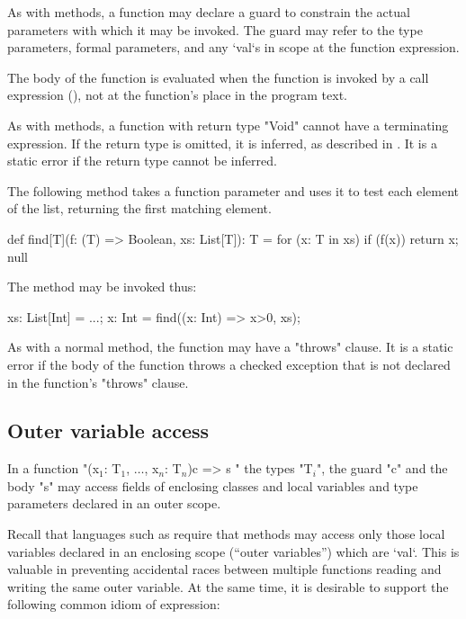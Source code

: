 As with methods, a function may declare a guard to
constrain the actual parameters with which it may be invoked.
The guard may refer to the type parameters, formal parameters,
and any \xcd`val`s in scope at the function expression.

The body of the function is evaluated when the function is
invoked by a call expression (), not at the function's
place in the program text.

As with methods, a function with return type \xcd"Void" cannot
have a terminating expression. 
If the return type is omitted, it is inferred, as described in
.
It is a static error if the return type cannot be inferred. 


\begin{example}
The following method takes a function parameter and uses it to
test each element of the list, returning the first matching
element.
\begin{xten}
def find[T](f: (T) => Boolean, xs: List[T]): T = {
  for (x: T in xs)
    if (f(x)) return x;
  null
}
\end{xten}

The method may be invoked thus:
\begin{xten}
xs: List[Int] = ...;
x: Int = find((x: Int) => x>0, xs);
\end{xten}
\end{example}

As with a normal method, the function may have a \xcd"throws"
clause. It is a static error if the body of the function throws a
checked exception that is not declared in the function's \xcd"throws"
clause.

\subsection{Outer variable access}

In a function
\xcdmath"(x$_1$: T$_1$, $\dots$, x$_n$: T$_n$){c} => { s }"
the types \xcdmath"T$_i$", the guard \xcd"c" and the body \xcd"s"
may access fields of enclosing classes and local variables and type
parameters declared in an outer scope.

Recall that languages such as \java{} require that methods may
access only those local variables declared in an enclosing scope
(``outer variables'') which are \xcd`val`. This is valuable in
preventing accidental races between multiple functions reading
and writing the same outer variable. At the same time, it is
desirable to support the following common idiom of expression:

